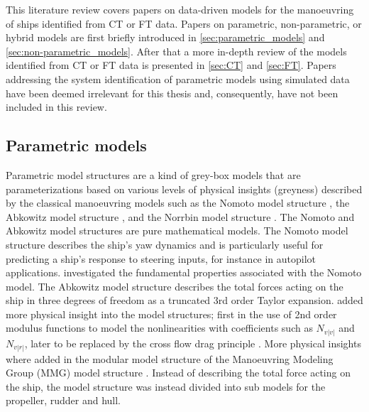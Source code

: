 This literature review covers papers on data-driven models for the manoeuvring of ships identified from CT or FT data. Papers on parametric, non-parametric, or hybrid models are first briefly introduced in \autoref{sec:parametric_models} and \ref{sec:non-parametric_models}. After that a more in-depth review of the models identified from CT or FT data is presented in \autoref{sec:CT} and \ref{sec:FT}.
Papers addressing the system identification of parametric models using simulated data have been deemed irrelevant for this thesis and, consequently, have not been included in this review.

\subsection{Parametric models} \label{sec:parametric_models}
Parametric model structures are a kind of grey-box models that are parameterizations based on various levels of physical insights (greyness) described by the classical manoeuvring models such as the Nomoto model structure \cite{nomotoSteeringQualitiesShips1957}, the Abkowitz model structure \cite{abkowitzShipHydrodynamicsSteering1964}, and the Norrbin model structure \cite{norrbinTheoryObservationsUse1971}. The Nomoto and Abkowitz model structures are pure mathematical models. The Nomoto model structure describes the ship's yaw dynamics and is particularly useful for predicting a ship's response to steering inputs, for instance in autopilot applications. \textcite{tzengFUNDAMENTALPROPERTIESLINEAR1999} investigated the fundamental properties associated with the Nomoto model. The Abkowitz model structure describes the total forces acting on the ship in three degrees of freedom as a truncated 3rd order Taylor expansion. \textcite{norrbinTheoryObservationsUse1971} added more physical insight into the model structures; first in the use of 2nd order modulus functions  to model the nonlinearities with coefficients such as $N_{v|v|}$ and $N_{v|r|}$, later to be replaced by the cross flow drag principle \cite{fossenHandbookMarineCraft2011}. More physical insights where added in the modular model structure of the Manoeuvring Modeling Group (MMG) model structure \cite{ogawaMathematicalModelManoeuvring1978,inouePracticalCalculationMethod1981,yasukawaIntroductionMMGStandard2015}. Instead of describing the total force acting on the ship, the model structure was instead divided into sub models for the propeller, rudder and hull.

